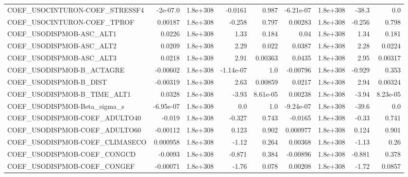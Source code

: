 \begin{tabular}{lrrrrrrrr}
COEF\_USOCINTURON-COEF\_STRESSF4    &    -2e-07.0 &     1.8e+308 &   -0.0161 &    0.987 &  -6.21e-07 &    1.8e+308 &        -38.3 &           0.0 \\
COEF\_USOCINTURON-COEF\_TPROF       &     0.00187 &     1.8e+308 &    -0.258 &    0.797 &    0.00283 &    1.8e+308 &       -0.256 &         0.798 \\
COEF\_USODISPMOB-ASC\_ALT1          &      0.0226 &     1.8e+308 &      1.33 &    0.184 &       0.04 &    1.8e+308 &         1.34 &         0.181 \\
COEF\_USODISPMOB-ASC\_ALT2          &      0.0209 &     1.8e+308 &      2.29 &    0.022 &     0.0387 &    1.8e+308 &         2.28 &        0.0224 \\
COEF\_USODISPMOB-ASC\_ALT3          &      0.0218 &     1.8e+308 &      2.91 &  0.00363 &     0.0435 &    1.8e+308 &         2.95 &       0.00317 \\
COEF\_USODISPMOB-B\_ACTAGRE         &    -0.00602 &     1.8e+308 & -1.14e-07 &      1.0 &   -0.00796 &    1.8e+308 &       -0.929 &         0.353 \\
COEF\_USODISPMOB-B\_DIST            &    -0.00319 &     1.8e+308 &      2.63 &  0.00859 &     0.0217 &    1.8e+308 &         2.94 &       0.00324 \\
COEF\_USODISPMOB-B\_TIME\_ALT1       &      0.0328 &     1.8e+308 &     -3.93 & 8.61e-05 &    0.00238 &    1.8e+308 &        -3.94 &      8.23e-05 \\
COEF\_USODISPMOB-Beta\_sigma\_s      &   -6.95e-07 &     1.8e+308 &       0.0 &      1.0 &  -9.24e-07 &    1.8e+308 &        -39.6 &           0.0 \\
COEF\_USODISPMOB-COEF\_ADULTO40     &      -0.019 &     1.8e+308 &    -0.327 &    0.743 &    -0.0165 &    1.8e+308 &        -0.33 &         0.741 \\
COEF\_USODISPMOB-COEF\_ADULTO60     &    -0.00112 &     1.8e+308 &     0.123 &    0.902 &   0.000977 &    1.8e+308 &        0.124 &         0.901 \\
COEF\_USODISPMOB-COEF\_CLIMASECO    &    0.000958 &     1.8e+308 &     -1.12 &    0.264 &    0.00368 &    1.8e+308 &        -1.13 &          0.26 \\
COEF\_USODISPMOB-COEF\_CONGCD       &     -0.0093 &     1.8e+308 &    -0.871 &    0.384 &   -0.00896 &    1.8e+308 &       -0.881 &         0.378 \\
COEF\_USODISPMOB-COEF\_CONGEF       &    -0.00071 &     1.8e+308 &     -1.76 &    0.078 &    0.00208 &    1.8e+308 &        -1.72 &        0.0857 \\

\end{tabular}
